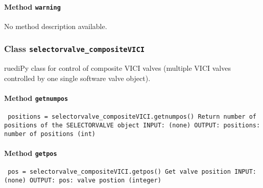 \paragraph{Method \texttt{warning}}
\vspace{1ex}
No method description available.\par

\subsubsection{Class \texttt{selectorvalve_compositeVICI}}
\par
ruediPy class for control of composite VICI valves (multiple VICI valves controlled by one single software valve object).\par

\paragraph{Method \texttt{getnumpos}}
\vspace{1ex}
\texttt{\newline
positions = selectorvalve_compositeVICI.getnumpos()\newline
\newline
Return number of positions of the SELECTORVALVE object\newline
\newline
INPUT:\newline
(none)\newline
\newline
OUTPUT:\newline
positions: number of positions (int)\newline
\newline
}

\paragraph{Method \texttt{getpos}}
\vspace{1ex}
\texttt{\newline
pos = selectorvalve_compositeVICI.getpos()\newline
\newline
Get valve position\newline
\newline
INPUT:\newline
(none)\newline
\newline
OUTPUT:\newline
pos: valve postion (integer)\newline
\newline
}

